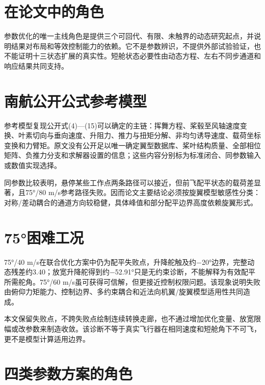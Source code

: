 \documentclass[UTF8,12pt,oneside,openany,fontset=windows]{ctexbook}
\begin{document}
\section{在论文中的角色}

参数优化的唯一主线角色是提供三个可回代、有限、未触界的动态研究起点，并说明结果对布局和等效控制能力的依赖。它不是参数辨识，不提供外部试验验证，也不能证明十三状态扩展的真实性。短舱状态必要性由动态方程、左右不同步通道和响应结果共同支持。

\section{南航公开公式参考模型}

参考模型复现公开式(4)—(15)可以确定的主链：挥舞方程、桨毂至风轴速度变换、叶素切向与垂向速度、升阻力、推力与扭矩分解、非均匀诱导速度、载荷坐标变换和力臂矩。原文没有公开足以唯一确定翼型数据库、桨叶结构质量、全部相位矩阵、负推力分支和求解器设置的信息；这些内容分别标为标准闭合、同参数输入或数值实现选择。

同参数比较表明，悬停某些工作点两条路径可以接近，但前飞配平状态的载荷差显著，且75°/80 m/s参考路径失败。因而论文主要结论必须按旋翼模型敏感性分类：对称/差动耦合的通道方向较稳健，具体峰值和部分配平边界高度依赖旋翼形式。

\section{75°困难工况}

75°/40 m/s在联合优化方案中仍为配平失败点，升降舵触及约−20°边界，完整动态残差约3.40；放宽升降舵得到约−52.91°只是无约束诊断，不能解释为有效配平所需舵角。75°/60 m/s虽可获得可信解，但更接近控制权限问题。该现象说明失败由俯仰力矩能力、控制边界、多约束耦合和近法向机翼/旋翼模型适用性共同造成。

本文保留失败点，不跨失败点绘制连续转换走廊，也不通过增加优化变量、放宽限幅或改参数来制造收敛。该诊断不等于真实飞行器在相同速度和短舱角下不可飞，更不是模型计算适用边界。

\section{四类参数方案的角色}
\end{document}
